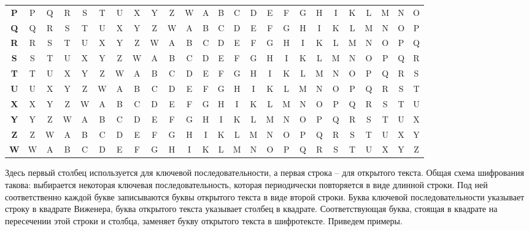 \begin{center}
{\begin{tabular}{|c|*{24}c|}
    \textbf{P} & P & Q & R & S & T & U & X & Y & Z & W & A & B & C & D & E & F & G & H & I & K & L & M & N & O \\
    \textbf{Q} & Q & R & S & T & U & X & Y & Z & W & A & B & C & D & E & F & G & H & I & K & L & M & N & O & P \\
    \textbf{R} & R & S & T & U & X & Y & Z & W & A & B & C & D & E & F & G & H & I & K & L & M & N & O & P & Q \\
    \textbf{S} & S & T & U & X & Y & Z & W & A & B & C & D & E & F & G & H & I & K & L & M & N & O & P & Q & R \\
    \textbf{T} & T & U & X & Y & Z & W & A & B & C & D & E & F & G & H & I & K & L & M & N & O & P & Q & R & S \\
    \textbf{U} & U & X & Y & Z & W & A & B & C & D & E & F & G & H & I & K & L & M & N & O & P & Q & R & S & T \\
    \textbf{X} & X & Y & Z & W & A & B & C & D & E & F & G & H & I & K & L & M & N & O & P & Q & R & S & T & U \\
    \textbf{Y} & Y & Z & W & A & B & C & D & E & F & G & H & I & K & L & M & N & O & P & Q & R & S & T & U & X \\
    \textbf{Z} & Z & W & A & B & C & D & E & F & G & H & I & K & L & M & N & O & P & Q & R & S & T & U & X & Y \\
    \textbf{W} & W & A & B & C & D & E & F & G & H & I & K & L & M & N & O & P & Q & R & S & T & U & X & Y & Z \\
    \hline
\end{tabular} } \end{center}

Здесь первый столбец используется для ключевой последовательности, а первая строка -- для открытого текста. Общая схема шифрования такова: выбирается некоторая ключевая последовательность, которая периодически повторяется в виде длинной строки. Под ней соответственно каждой букве записываются буквы открытого текста в виде второй строки. Буква ключевой последовательности указывает строку в квадрате Виженера, буква открытого текста указывает столбец в квадрате. Соответствующая буква, стоящая в квадрате на пересечении этой строки и столбца, заменяет букву открытого текста в шифротексте. Приведем примеры.

